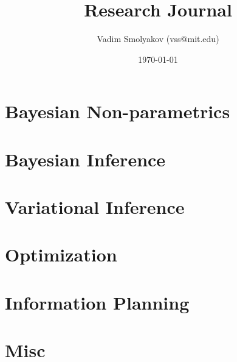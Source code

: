 \documentclass[11pt,a4paper]{article}
\begin{document}
\title{Research Journal}
\date{\today}
\author{Vadim Smolyakov (vss@mit.edu)}
\maketitle

\tableofcontents
\newpage

%

\section{Bayesian Non-parametrics}


\newpage
\section{Bayesian Inference}


\newpage
\section{Variational Inference}


\newpage
\section{Optimization}


\newpage
\section{Information Planning}


\newpage
\section{Misc}


%



\end{document}
